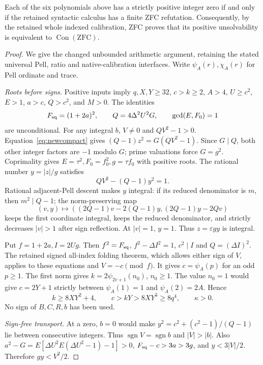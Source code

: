 \begin{theorem}\label{thm:compact-six}
Each of the six polynomials above has a strictly positive integer zero
if and only if the retained syntactic calculus has a finite ZFC
refutation. Consequently, by the retained whole indexed calibration,
ZFC proves that its positive unsolvability is equivalent to
$\operatorname{Con}(\mathrm{ZFC})$.
\end{theorem}
\begin{proof}
We give the changed unbounded arithmetic argument, retaining the stated
universal Pell, ratio and native-calibration interfaces. Write
$\psi_A(r),\chi_A(r)$ for Pell ordinate and trace.

\emph{Roots before signs.}
Positive inputs imply $q,X,Y\ge32$, $c>k\ge2$, $A>4$, $U\ge c^2$,
$E>1$, $a>c$, $Q>c^2$, and $M>0$. The identities
\[
 F_{\rm sq}=(1+2a)^2,\qquad
 Q=4\Delta^2U^2G,\qquad \gcd(E,F_0)=1
\]
are unconditional. For any integral $b$, $V\ne0$ and $QV^2-1>0$.
Equation~\eqref{eq:newcompact} gives
$(Q-1)z^2=G(QV^2-1)$. Since $G\mid Q$, both other integer factors
are $-1$ modulo $G$; prime valuations force $G=g^2$.
Coprimality gives $E=\tau^2,F_0=f_0^2,g=\tau f_0$ with positive roots.
The rational number $y=|z|/g$ satisfies
\begin{equation}\label{eq:adjacent-new}
 QV^2-(Q-1)y^2=1.
\end{equation}
Rational adjacent-Pell descent makes $y$ integral: if its reduced
denominator is $m$, then $m^2\mid Q-1$; the norm-preserving map
\[
 (v,y)\longmapsto((2Q-1)v-2(Q-1)y, (2Q-1)y-2Qv)
\]
keeps the first coordinate integral, keeps the reduced denominator,
and strictly decreases $|v|>1$ after sign reflection. At $|v|=1$,
$y=1$. Thus $z=\varepsilon gy$ is integral.

Put $f=1+2a,I=2Ug$. Then
$f^2=F_{\rm sq}$, $f^2-\Delta I^2=1$, $c^2\mid I$ and
$Q=(\Delta I)^2$. The retained signed all-index folding theorem,
which allows either sign of $V$, applies to these equations and
$V=-c\pmod f$. It gives $c=\psi_A(p)$ for an odd $p\ge1$.
The first norm gives $k=2\psi_{2v+1}(n_0)$, $n_0\ge1$.
The value $n_0=1$ would give $c=2Y+1$ strictly between
$\psi_A(1)=1$ and $\psi_A(2)=2A$. Hence
\begin{equation}\label{eq:earlyc}
 k\ge8XY^2+4,\qquad c>kY>8XY^3\ge8q^4,
 \qquad \kappa>0.
\end{equation}
No sign of $B,C,R,b$ has been used.

\emph{Sign-free transport.}
At a zero, $b=0$ would make
$y^2=c^2+(c^2-1)/(Q-1)$ lie between consecutive integers. Thus
$\operatorname{sgn}V=\operatorname{sgn}b$ and $|V|>|b|$.
Also $a^2-G=E[\Delta U^2E(\Delta U^2-1)-1]>0$,
$F_{\rm sq}-c>3a>3g$, and $y<3|V|/2$.
Therefore $gy<V^2/2$.


\end{proof}
